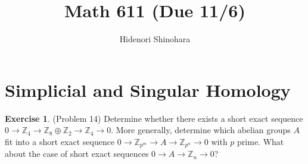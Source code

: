 \documentclass[12pt, psamsfonts]{amsart}
\theoremstyle{definition}
\newtheorem*{exer}{Exercise}
\theoremstyle{remark}
\numberwithin{equation}{section}
\begin{document}
\title{Math 611 (Due 11/6)}
\author{Hidenori Shinohara}
\maketitle

\section{Simplicial and Singular Homology}

\begin{exer}{(Problem 14)}
  Determine whether there exists a short exact sequence $0 \rightarrow \mathbb{Z}_4 \rightarrow \mathbb{Z}_8 \oplus \mathbb{Z}_2 \rightarrow \mathbb{Z}_4 \rightarrow 0$.
  More generally, determine which abelian groups $A$ fit into a short exact sequence $0 \rightarrow \mathbb{Z}_{p^m} \rightarrow A \rightarrow \mathbb{Z}_{p^n} \rightarrow 0$ with $p$ prime.
  What about the case of short exact sequences $0 \rightarrow A \rightarrow \mathbb{Z}_n \rightarrow 0$?
\end{exer}
\end{document}
